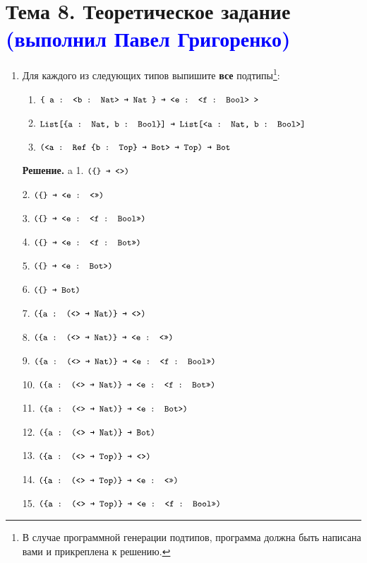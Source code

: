 \documentclass[dvipsnames]{article}
\let\codeOrig\code
\renewcommand{\code}[2][]{%
  \ifmmode
    \if\relax\detokenize{#1}\relax
      \mathchoice{\mbox{\normalfont\small\ttfamily #2}}{\mbox{\normalfont\small\ttfamily #2}}{\mbox{\normalfont\small\ttfamily #2}}{\mbox{\normalfont\small\ttfamily #2}}%
    \else
      \mathchoice{\mbox{\normalfont\small\ttfamily #2}}{\mbox{\normalfont\small\ttfamily #2}}{\mbox{\normalfont\small\ttfamily #2}}{\mbox{\normalfont\small\ttfamily #2}}%
    \fi
  \else
    \codeOrig[#1]{#2}%
  \fi}
\begin{document}
\pagestyle{fancy}
\fancyhf{}

\section*{Тема 8. Теоретическое задание \textcolor{blue}{(выполнил Павел Григоренко)}}%

\begin{enumerate}
  \item Для каждого из следующих типов выпишите \textbf{все} подтипы\footnote{В случае программной генерации подтипов, программа должна быть написана вами и прикреплена к решению.}:
    \begin{enumerate}
      \item $\code{\{ a : <b : Nat> → Nat \} → <e : <f : Bool> >}$
      \item $\code{List[\{a : Nat, b : Bool\}] → List[<a : Nat, b : Bool>]}$
      \item $\code{(<a : Ref \{b : Top\} → Bot> → Top) → Bot}$
    \end{enumerate}

  \color{blue}
  \textbf{Решение.}
      a
      1. $\code{(\{\} → <>)}$

      2. $\code{(\{\} → <e : <>>)}$

      3. $\code{(\{\} → <e : <f : Bool>>)}$

      4. $\code{(\{\} → <e : <f : Bot>>)}$

      5. $\code{(\{\} → <e : Bot>)}$

      6. $\code{(\{\} → Bot)}$

      7. $\code{(\{a : (<> → Nat)\} → <>)}$

      8. $\code{(\{a : (<> → Nat)\} → <e : <>>)}$

      9. $\code{(\{a : (<> → Nat)\} → <e : <f : Bool>>)}$

      10. $\code{(\{a : (<> → Nat)\} → <e : <f : Bot>>)}$

      11. $\code{(\{a : (<> → Nat)\} → <e : Bot>)}$

      12. $\code{(\{a : (<> → Nat)\} → Bot)}$

      13. $\code{(\{a : (<> → Top)\} → <>)}$

      14. $\code{(\{a : (<> → Top)\} → <e : <>>)}$

      15. $\code{(\{a : (<> → Top)\} → <e : <f : Bool>>)}$


\end{enumerate}
\end{document}
